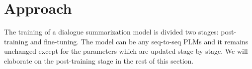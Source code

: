 \section{Approach}
\label{sec:approach}

The training of a dialogue summarization model is divided two stages: 
post-training and fine-tuning. The model can be any seq-to-seq PLMs
and it remains unchanged
except for the parameters which are updated stage by stage.
We will elaborate on the post-training stage in the rest of this section.
%

%	


%

